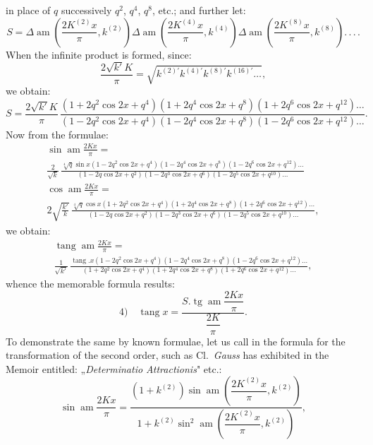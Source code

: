 \documentclass{article}
\begin{document}
in place of $q$ successively $q^{2}$, $q^{4}$, $q^{8}$, etc.; and further let:
\[
S=\Delta\operatorname{am}\left(\frac{2K^{(2)}x}{\pi},k^{(2)}\right)\Delta\operatorname{am}\left(\frac{2K^{(4)}x}{\pi},k^{(4)}\right)\Delta\operatorname{am}\left(\frac{2K^{(8)}x}{\pi},k^{(8)}\right).\,.\,.\,.
\]
When the infinite product is formed, since:
\[
\frac{2\sqrt{k'}K}{\pi}=\sqrt{k^{(2)\prime}k^{(4)\prime}k^{(8)\prime}k^{(16)\prime}\ldots},
\]
we obtain:
\[
S=\frac{2\sqrt{k'}K}{\pi}\,\frac{(1+2q^{2}\cos 2x+q^{4})(1+2q^{4}\cos 2x+q^{8})(1+2q^{6}\cos 2x+q^{12})\ldots}{(1-2q^{2}\cos 2x+q^{4})(1-2q^{4}\cos 2x+q^{8})(1-2q^{6}\cos 2x+q^{12})\ldots}.
\]
Now from the formulae:
\[
\begin{gathered}
\sin\operatorname{am}\frac{2Kx}{\pi}=
\\[1ex]
\frac{2}{\sqrt{k}}\,\frac{\sqrt[4]{q}\sin x(1-2q^{2}\cos 2x+q^{4})(1-2q^{4}\cos 2x+q^{8})(1-2q^{6}\cos 2x+q^{12})\ldots}{(1-2q\cos 2x+q^{2})(1-2q^{3}\cos 2x+q^{6})(1-2q^{5}\cos 2x+q^{10})\ldots}
\\[2ex]
\cos\operatorname{am}\frac{2Kx}{\pi}=
\\[1ex]
2\sqrt{\frac{k'}{k}}\,\frac{\sqrt[4]{q}\cos x(1+2q^{2}\cos 2x+q^{4})(1+2q^{4}\cos 2x+q^{8})(1+2q^{6}\cos 2x+q^{12})\ldots}{(1-2q\cos 2x+q^{2})(1-2q^{3}\cos 2x+q^{6})(1-2q^{5}\cos 2x+q^{10})\ldots},
\end{gathered}
\]
we obtain:
\[
\begin{gathered}
\operatorname{tang}\operatorname{am}\frac{2Kx}{\pi}=
\\[1ex]
\frac{1}{\sqrt{k'}}\,\frac{\operatorname{tang}.x(1-2q^{2}\cos 2x+q^{4})(1-2q^{4}\cos 2x+q^{8})(1-2q^{6}\cos 2x+q^{12})\ldots}{(1+2q^{2}\cos 2x+q^{4})(1+2q^{4}\cos 2x+q^{8})(1+2q^{6}\cos 2x+q^{12})\ldots},
\end{gathered}
\]
whence the memorable formula results:
\[
\text{4)}\quad\operatorname{tang}x=\frac{S.\operatorname{tg}\operatorname{am}\dfrac{2Kx}{\pi}}{\dfrac{2K}{\pi}}.
\]
To demonstrate the same by known formulae, let us call in the formula for the transformation of the second order, such as Cl.\ \emph{Gauss} has exhibited in the Memoir entitled: „\emph{Determinatio Attractionis}" etc.:
\[
\sin\operatorname{am}\frac{2Kx}{\pi}=\frac{(1+k^{(2)})\sin\operatorname{am}\left(\dfrac{2K^{(2)}x}{\pi},k^{(2)}\right)}{1+k^{(2)}\sin^{2}\operatorname{am}\left(\dfrac{2K^{(2)}x}{\pi},k^{(2)}\right)},
\]
\end{document}
